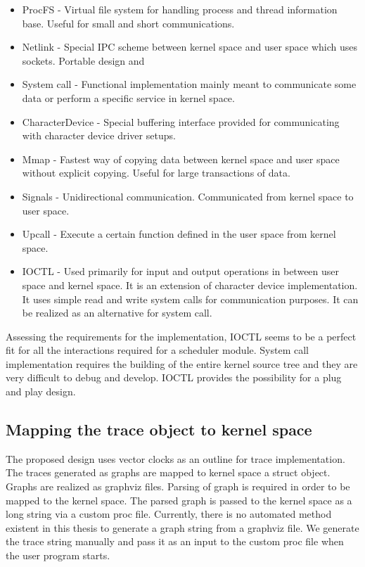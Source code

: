 \begin{itemize}
\item ProcFS - Virtual file system for handling process and thread information base. Useful for small and short communications. 
\item Netlink - Special IPC scheme between kernel space and user space which uses sockets. Portable design and 
\item System call - Functional implementation mainly meant to communicate some data or perform a specific service in kernel space. 
\item CharacterDevice - Special buffering interface provided for communicating with character device driver setups.
\item Mmap - Fastest way of copying data between kernel space and user space without explicit copying. Useful for large transactions of data.
\item Signals - Unidirectional communication. Communicated from kernel space to user space. 
\item Upcall - Execute a certain function defined in the user space from kernel space.
\item IOCTL - Used primarily for input and output operations in between user space and kernel space. It is an extension of character device implementation. It uses simple read and write system calls for communication purposes. It can be realized as an alternative for system call.

\end{itemize}


Assessing the requirements for the implementation, IOCTL seems to be a perfect fit for all the interactions required for a scheduler module. 
System call implementation requires the building of the entire kernel source tree and they are very difficult to debug and develop. 
IOCTL provides the possibility for a plug and play design.

\subsection{Mapping the trace object to kernel space}

The proposed design uses vector clocks as an outline for trace implementation. 
The traces generated as graphs are mapped to kernel space a struct object. 
Graphs are realized as graphviz files. 
Parsing of graph is required in order to be mapped to the kernel space. 
The parsed graph is passed to the kernel space as a long string via a custom proc file. 
Currently, there is no automated method existent in this thesis to generate a graph string from a graphviz file. 
We generate the trace string manually and pass it as an input to the custom proc file when the user program starts.

